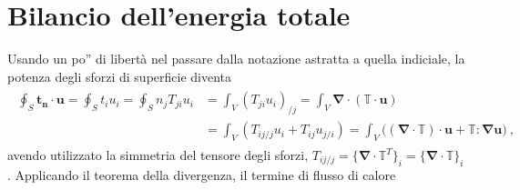 \documentclass[letterpaper,10pt,italian]{jupyterBook}
\begin{document}
\section{Bilancio dell’energia totale}
\label{\detokenize{polimi/fluidmechanics-ita/template/capitoli/04_bilanci/04teoria:id2}}
\sphinxAtStartPar
Usando un po” di libertà nel passare dalla notazione astratta a quella
indiciale, la potenza degli sforzi di superficie diventa
\begin{equation*}
\begin{split}\begin{aligned}
 \oint_S \mathbf{t_n} \cdot \mathbf{u} = \oint_S t_i u_i = \oint_S n_j T_{ji} u_i & =
  \int_V (T_{ji} u_i)_{/j}= \int_V \mathbf{\nabla} \cdot ( \mathbb{T} \cdot \mathbf{u}) \\
  & = \int_V (T_{ij/j} u_i + T_{ij} u_{j/i}) = \int_V \big( (\mathbf{\nabla} \cdot \mathbb{T}) \cdot \mathbf{u} + \mathbb{T} : \mathbf{\nabla} \mathbf{u} \big) \ , 
\end{aligned}\end{split}
\end{equation*}
\sphinxAtStartPar
avendo utilizzato la simmetria del tensore degli sforzi,
\(T_{ij/j} = \{ \mathbf{\nabla} \cdot \mathbb{T}^T \}_i = \{ \mathbf{\nabla} \cdot \mathbb{T} \}_i\).
Applicando il teorema della divergenza, il termine di flusso di calore
\end{document}
